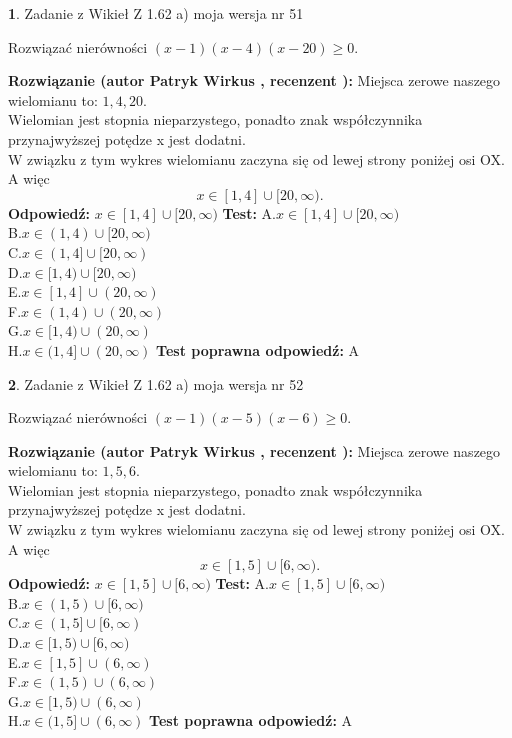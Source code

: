 \documentclass[12pt, a4paper]{article}
\theoremstyle{definition} %
\newtheorem{zad}{}
\newcommand{\zadStart}[1]{\begin{zad}#1\newline}
\newcommand{\zadStop}{\end{zad}}
\newcommand{\rozwStart}[2]{\noindent \textbf{Rozwiązanie (autor #1 , recenzent #2): }\newline}
\newcommand{\rozwStop}{\newline}
\newcommand{\odpStart}{\noindent \textbf{Odpowiedź:}\newline}
\newcommand{\odpStop}{\newline}
\newcommand{\testStart}{\noindent \textbf{Test:}\newline}
\newcommand{\testStop}{\newline}
\newcommand{\kluczStart}{\noindent \textbf{Test poprawna odpowiedź:}\newline}
\newcommand{\kluczStop}{\newline}
\begin{document}
\zadStart{Zadanie z Wikieł Z 1.62 a) moja wersja nr 51}

Rozwiązać nierówności $(x-1)(x-4)(x-20)\ge0$.
\zadStop
\rozwStart{Patryk Wirkus}{}
Miejsca zerowe naszego wielomianu to: $1, 4, 20$.\\
Wielomian jest stopnia nieparzystego, ponadto znak współczynnika przy\linebreak najwyższej potędze x jest dodatni.\\ W związku z tym wykres wielomianu zaczyna się od lewej strony poniżej osi OX. A więc $$x \in [1,4] \cup [20,\infty).$$
\rozwStop
\odpStart
$x \in [1,4] \cup [20,\infty)$
\odpStop
\testStart
A.$x \in [1,4] \cup [20,\infty)$\\
B.$x \in (1,4) \cup [20,\infty)$\\
C.$x \in (1,4] \cup [20,\infty)$\\
D.$x \in [1,4) \cup [20,\infty)$\\
E.$x \in [1,4] \cup (20,\infty)$\\
F.$x \in (1,4) \cup (20,\infty)$\\
G.$x \in [1,4) \cup (20,\infty)$\\
H.$x \in (1,4] \cup (20,\infty)$
\testStop
\kluczStart
A
\kluczStop



\zadStart{Zadanie z Wikieł Z 1.62 a) moja wersja nr 52}

Rozwiązać nierówności $(x-1)(x-5)(x-6)\ge0$.
\zadStop
\rozwStart{Patryk Wirkus}{}
Miejsca zerowe naszego wielomianu to: $1, 5, 6$.\\
Wielomian jest stopnia nieparzystego, ponadto znak współczynnika przy\linebreak najwyższej potędze x jest dodatni.\\ W związku z tym wykres wielomianu zaczyna się od lewej strony poniżej osi OX. A więc $$x \in [1,5] \cup [6,\infty).$$
\rozwStop
\odpStart
$x \in [1,5] \cup [6,\infty)$
\odpStop
\testStart
A.$x \in [1,5] \cup [6,\infty)$\\
B.$x \in (1,5) \cup [6,\infty)$\\
C.$x \in (1,5] \cup [6,\infty)$\\
D.$x \in [1,5) \cup [6,\infty)$\\
E.$x \in [1,5] \cup (6,\infty)$\\
F.$x \in (1,5) \cup (6,\infty)$\\
G.$x \in [1,5) \cup (6,\infty)$\\
H.$x \in (1,5] \cup (6,\infty)$
\testStop
\kluczStart
A
\kluczStop
\end{document}
